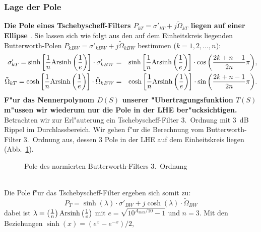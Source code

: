 \subsubsection{Lage der Pole}
{\bf{\boldmath Die Pole eines Tschebyscheff-Filters $P_{kT}=\sigma'_{kT}+j\tilde{\Omega}_{kT}$ liegen auf einer Ellipse} \cite{MOS:89}}. Sie lassen sich wie folgt aus 
den auf dem Einheitskreis liegenden Butterworth-Polen 
$P_{kBW}=\sigma'_{kBW}+j\tilde{\Omega}_{kBW}$ bestimmen ($k=1, 2, \ldots, n$):\\
\begin{eqnarray}
\sigma'_{kT}=\sinh{\left[\frac{1}{n}{\rm Arsinh}\left(\frac{1}{e}\right)\right]}
\cdot \sigma'_{kBW}&=&\sinh{\left[\frac{1}{n}{\rm Arsinh}\left(\frac{1}{e}\right)\right]}
\cdot \cos{\left(\frac{2k+n-1}{2n}\pi\right)}, \nonumber \\
\tilde{\Omega}_{kT}=\cosh{\left[\frac{1}{n}{\rm Arsinh}\left(\frac{1}{e}\right)
\right]}\cdot \tilde{\Omega}_{kBW}&=&\cosh{\left[\frac{1}{n}{\rm Arsinh}\left(\frac{1}{e}\right)
\right]}\cdot \sin{\left(\frac{2k+n-1}{2n}\pi\right)}. \nonumber 
\end{eqnarray}
{\bf{\boldmath F"ur das Nennerpolynom $D(S)$ unserer "Ubertragungsfunktion
  $T(S)$ m"ussen wir wiederum nur die Pole in der LHE
  ber"ucksichtigen.}}  Betrachten wir zur Erl"auterung ein
Tschebyscheff-Filter 3.~Ordnung mit 3~dB Rippel im
Durchlassbereich. Wir gehen f"ur die Berechnung vom Butter\-worth-Filter
3.~Ordnung aus, dessen 3 Pole in der LHE auf dem Einheitskreis
liegen (Abb.~\ref{Pole-BW}).
\begin{figure}[!htb]%
\vspace*{-3mm}
\begin{center}
  \vspace*{-15mm}\caption{Pole des normierten Butterworth-Filters 3.~Ordnung \label{Pole-BW}}
\end{center}
\vspace*{-6mm} 
\end{figure}\\
\nit Die Pole f"ur das Tschebyscheff-Filter ergeben sich somit zu:
\begin{equation}
P_{T}=\sinh{(\lambda)}\cdot\sigma'_{BW}+j\cosh{(\lambda)}\cdot
\tilde{\Omega}_{BW}
\end{equation}
dabei ist $\lambda=\left(\frac{1}{n}\right){\rm
  Arsinh}\left(\frac{1}{e}\right)$ mit $e=\sqrt{10^{A_{\max}/10}-1}$
und $n=3$. Mit den Beziehungen $\sinh{(x)}=(e^{x}-e^{-x})/2$,
